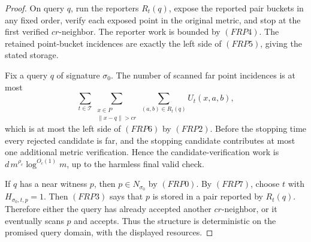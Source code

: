\documentclass[10pt]{article}
\theoremstyle{definition}
\begin{document}
\begin{proof}
   On query \(q\), run the reporters \(R_t(q)\), expose the reported pair
   buckets in any fixed order, verify each exposed point in the original
   metric, and stop at the first verified \(cr\)-neighbor.  The reporter work
   is bounded by \((FRP4)\).  The retained point-bucket incidences are exactly
   the left side of \((FRP5)\), giving the stated storage.

   Fix a query \(q\) of signature \(\sigma_0\).  The number of scanned far
   point incidences is at most
   \[
      \sum_{t\in\mathcal T}
      \sum_{\substack{x\in P\\ \|x-q\|>cr}}
      \sum_{(a,b)\in R_t(q)}U_t(x,a,b),
   \]
   which is at most the left side of \((FRP6)\) by \((FRP2)\).  Before the
   stopping time every rejected candidate is far, and the stopping candidate
   contributes at most one additional metric verification.  Hence the
   candidate-verification work is \(d\,m^{\rho_c}\log^{O_c(1)}m\), up to the
   harmless final valid check.

   If \(q\) has a near witness \(p\), then \(p\in N_{\sigma_0}\) by
   \((FRP0)\).  By \((FRP7)\), choose \(t\) with
   \(H_{\sigma_0,t,p}=1\).  Then \((FRP3)\) says that \(p\) is stored in a pair
   reported by \(R_t(q)\).  Therefore either the query has already accepted
   another \(cr\)-neighbor, or it eventually scans \(p\) and accepts.  Thus the
   structure is deterministic on the promised query domain, with the displayed
   resources.
\end{proof}
\end{document}
